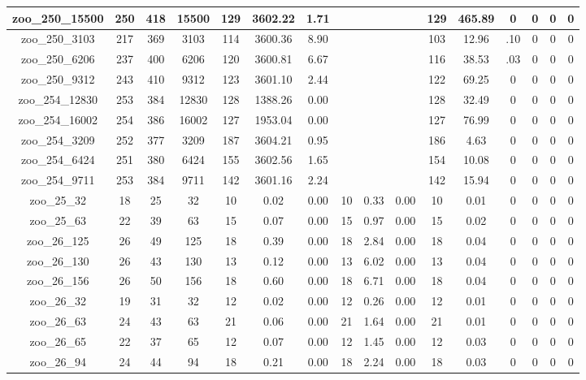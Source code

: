 \begin{landscape}
\begin{longtable}{|c|c|c|c|c|c|c|c|c|c|c|c|c|c|c|c|}
zoo\_250\_15500 & 250 & 418 & 15500 & 129 & 3602.22 & 1.71 &  &  &  & 129 & 465.89 & 0 & 0 & 0 & 0 \\ \hline 
zoo\_250\_3103 & 217 & 369 & 3103 & 114 & 3600.36 & 8.90 &  &  &  & 103 & 12.96 & .10 & 0 & 0 & 0 \\ \hline 
zoo\_250\_6206 & 237 & 400 & 6206 & 120 & 3600.81 & 6.67 &  &  &  & 116 & 38.53 & .03 & 0 & 0 & 0 \\ \hline 
zoo\_250\_9312 & 243 & 410 & 9312 & 123 & 3601.10 & 2.44 &  &  &  & 122 & 69.25 & 0 & 0 & 0 & 0 \\ \hline 
zoo\_254\_12830 & 253 & 384 & 12830 & 128 & 1388.26 & 0.00 &  &  &  & 128 & 32.49 & 0 & 0 & 0 & 0 \\ \hline 
zoo\_254\_16002 & 254 & 386 & 16002 & 127 & 1953.04 & 0.00 &  &  &  & 127 & 76.99 & 0 & 0 & 0 & 0 \\ \hline 
zoo\_254\_3209 & 252 & 377 & 3209 & 187 & 3604.21 & 0.95 &  &  &  & 186 & 4.63 & 0 & 0 & 0 & 0 \\ \hline 
zoo\_254\_6424 & 251 & 380 & 6424 & 155 & 3602.56 & 1.65 &  &  &  & 154 & 10.08 & 0 & 0 & 0 & 0 \\ \hline 
zoo\_254\_9711 & 253 & 384 & 9711 & 142 & 3601.16 & 2.24 &  &  &  & 142 & 15.94 & 0 & 0 & 0 & 0 \\ \hline 
zoo\_25\_32 & 18 & 25 & 32 & 10 & 0.02 & 0.00 & 10 & 0.33 & 0.00 & 10 & 0.01 & 0 & 0 & 0 & 0 \\ \hline 
zoo\_25\_63 & 22 & 39 & 63 & 15 & 0.07 & 0.00 & 15 & 0.97 & 0.00 & 15 & 0.02 & 0 & 0 & 0 & 0 \\ \hline 
zoo\_26\_125 & 26 & 49 & 125 & 18 & 0.39 & 0.00 & 18 & 2.84 & 0.00 & 18 & 0.04 & 0 & 0 & 0 & 0 \\ \hline 
zoo\_26\_130 & 26 & 43 & 130 & 13 & 0.12 & 0.00 & 13 & 6.02 & 0.00 & 13 & 0.04 & 0 & 0 & 0 & 0 \\ \hline 
zoo\_26\_156 & 26 & 50 & 156 & 18 & 0.60 & 0.00 & 18 & 6.71 & 0.00 & 18 & 0.04 & 0 & 0 & 0 & 0 \\ \hline 
zoo\_26\_32 & 19 & 31 & 32 & 12 & 0.02 & 0.00 & 12 & 0.26 & 0.00 & 12 & 0.01 & 0 & 0 & 0 & 0 \\ \hline 
zoo\_26\_63 & 24 & 43 & 63 & 21 & 0.06 & 0.00 & 21 & 1.64 & 0.00 & 21 & 0.01 & 0 & 0 & 0 & 0 \\ \hline 
zoo\_26\_65 & 22 & 37 & 65 & 12 & 0.07 & 0.00 & 12 & 1.45 & 0.00 & 12 & 0.03 & 0 & 0 & 0 & 0 \\ \hline 
zoo\_26\_94 & 24 & 44 & 94 & 18 & 0.21 & 0.00 & 18 & 2.24 & 0.00 & 18 & 0.03 & 0 & 0 & 0 & 0 \\ \hline 

\end{longtable}
\end{landscape}
